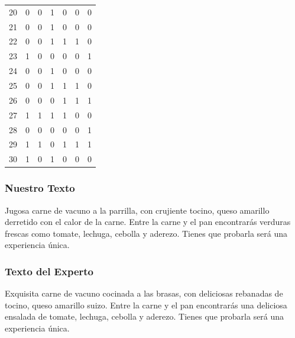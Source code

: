 \begin{table}
\begin{tabular}{|r|c|c|c|c|c|c|}
20 &         0 &         0 &         1 &         0 &         0 &         0 \\
21 &         0 &         0 &         1 &         0 &         0 &         0 \\
22 &         0 &         0 &         1 &         1 &         1 &         0 \\
23 &         1 &         0 &         0 &         0 &         0 &         1 \\
24 &         0 &         0 &         1 &         0 &         0 &         0 \\
25 &         0 &         0 &         1 &         1 &         1 &         0 \\
26 &         0 &         0 &         0 &         1 &         1 &         1 \\
27 &         1 &         1 &         1 &         1 &         0 &         0 \\
28 &         0 &         0 &         0 &         0 &         0 &         1 \\
29 &         1 &         1 &         0 &         1 &         1 &         1 \\
30 &         1 &         0 &         1 &         0 &         0 &         0 

\end{tabular}
\end{table}



\subsubsection{Nuestro Texto}

Jugosa carne de vacuno  a la parrilla, con crujiente tocino, queso amarillo  derretido con el calor de la carne. Entre la carne y el pan encontrarás verduras frescas como tomate, lechuga, cebolla y aderezo. Tienes que probarla será una experiencia única.

\subsubsection{Texto del Experto}

Exquisita carne de vacuno  cocinada a las brasas, con deliciosas rebanadas de tocino, queso amarillo suizo. Entre la carne y el pan encontrarás una deliciosa ensalada de tomate, lechuga, cebolla y aderezo. Tienes que probarla será una experiencia única.

